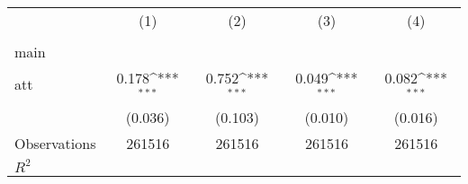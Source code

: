 {
\def\sym#1{\ifmmode^{#1}\else\(^{#1}\)\fi}
\begin{tabular}{l*{4}{c}}
\hline\hline
                    &\multicolumn{1}{c}{(1)}&\multicolumn{1}{c}{(2)}&\multicolumn{1}{c}{(3)}&\multicolumn{1}{c}{(4)}\\
                    &\multicolumn{1}{c}{} &\multicolumn{1}{c}{} &\multicolumn{1}{c}{} &\multicolumn{1}{c}{} \\
\hline
main                &                     &                     &                     &                     \\
att                 &       0.178\sym{***}&       0.752\sym{***}&       0.049\sym{***}&       0.082\sym{***}\\
                    &     (0.036)         &     (0.103)         &     (0.010)         &     (0.016)         \\
\hline
Observations        &      261516         &      261516         &      261516         &      261516         \\
\(R^{2}\)           &                     &                     &                     &                     \\
\hline\hline
\end{tabular}
}
